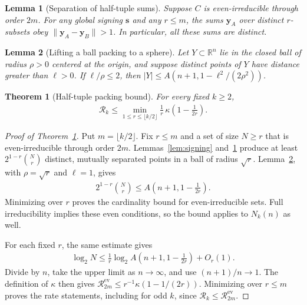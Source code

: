 \documentclass[10pt,a4paper]{amsart}
\newtheorem{theorem}{Theorem}
\newtheorem{lemma}{Lemma}
\newcommand{\RR}{\mathbb R}
\newcommand{\Rrate}{\mathcal{R}}
\newcommand{\ev}{\mathrm{ev}}
\newcommand{\norm}[1]{\lVert#1\rVert}
\newcommand{\vs}{\mathbf{s}}
\newcommand{\vy}{\mathbf{y}}
\begin{document}
\begin{lemma}[Separation of half-tuple sums]
\label{lem:separation}
Suppose $C$ is even-irreducible through order $2m$. For any global signing $\vs$ and any $r\le m$, the sums $\vy_A$ over distinct $r$-subsets obey $\norm{\vy_A-\vy_B}>1$. In particular, all these sums are distinct.
\end{lemma}

\begin{lemma}[Lifting a ball packing to a sphere]
\label{lem:lift}
Let $Y\subset\RR^n$ lie in the closed ball of radius $\rho>0$ centered at the origin, and suppose distinct points of $Y$ have distance greater than $\ell>0$. If $\ell/\rho\le2$, then $|Y|\le A(n+1,1-\ell^2/(2\rho^2))$.
\end{lemma}

\begin{theorem}[Half-tuple packing bound]
\label{thm:upper}
For every fixed $k\ge2$,
\begin{align}\label{eq:main-upper}
 \Rrate_k \le \min_{1\le r\le\lfloor k/2\rfloor} \frac{1}{r} \, \kappa\!\left(1-\frac1{2r}\right).
\end{align}
\end{theorem}

\begin{proof}[Proof of Theorem~\ref{thm:upper}]
Put $m=\lfloor k/2\rfloor$. Fix $r\le m$ and a set of size $N\ge r$ that is even-irreducible through order $2m$. Lemmas~\ref{lem:signing} and~\ref{lem:separation} produce at least $2^{1-r}\binom Nr$ distinct, mutually separated points in a ball of radius $\sqrt r$. Lemma~\ref{lem:lift}, with $\rho=\sqrt r$ and $\ell=1$, gives
\begin{align}\label{eq:finite-upper}
 2^{1-r}\binom Nr\le A\!\left(n+1,1-\frac1{2r}\right).
\end{align}
Minimizing over $r$ proves the cardinality bound for even-irreducible sets. Full irreducibility implies these even conditions, so the bound applies to $N_k(n)$ as well.

For each fixed $r$, the same estimate gives
\begin{align}
 \log_2N\le\frac1r\log_2 A\!\left(n+1,1-\frac1{2r}\right)+O_r(1).
\end{align}
Divide by $n$, take the upper limit as $n\to\infty$, and use $(n+1)/n\to1$. The definition of $\kappa$ then gives $\Rrate^{\ev}_{2m}\le r^{-1}\kappa(1-1/(2r))$. Minimizing over $r\le m$ proves the rate statements, including for odd $k$, since $\Rrate_k\le\Rrate^{\ev}_{2m}$.
\end{proof}
\end{document}
